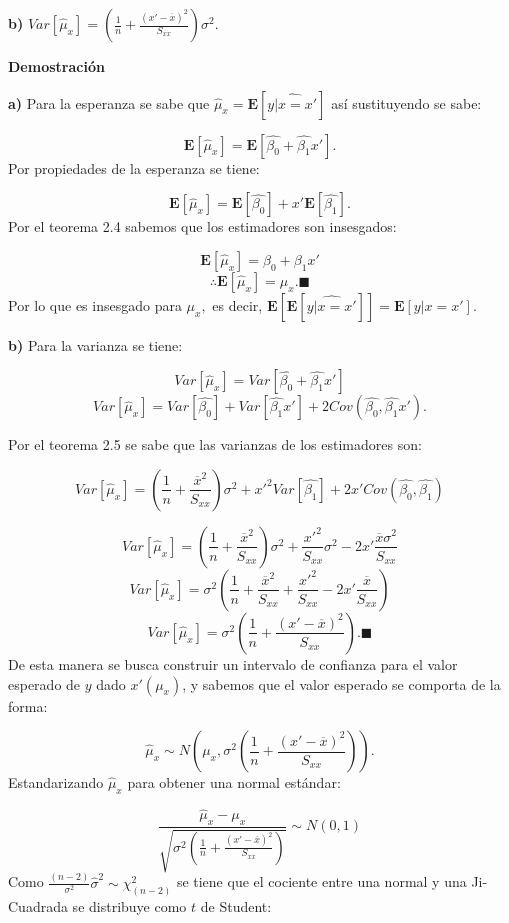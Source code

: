 \documentclass[a4paper,oneside,openany]{book}
\begin{document}
\textbf{b)}
\(Var[\hat{\mu}_{x}]=\left(\frac{1}{n}+\frac{(x'-\overline{x})^2}{S_{xx}}\right)\sigma^2.\)

\textbf{Demostración}

\textbf{a)} Para la esperanza se sabe que
\(\hat{\mu}_{x}=\mathbf{E}[\widehat{y|x=x'}]\) así sustituyendo se sabe:

\[\mathbf{E}[\hat{\mu}_{x}]=\mathbf{E}\left[\hat{\beta_{0}}+\hat{\beta_{1}}x' \right].\]
Por propiedades de la esperanza se tiene:

\[\mathbf{E}[\hat{\mu}_{x}]=\mathbf{E}\left[\hat{\beta_{0}}\right]+x'\mathbf{E}\left[\hat{\beta_{1}} \right].\]
Por el teorema 2.4 sabemos que los estimadores son insesgados:

\[\mathbf{E}[\hat{\mu}_{x}]=\beta_{0}+\beta_{1}x'\]
\[\therefore \mathbf{E}[\hat{\mu}_{x}]=\mu_{x}. \blacksquare\] Por lo
que es insesgado para \(\mu_{x},\) es decir,
\(\mathbf{E}\left[\mathbf{E}[\widehat{y|x=x'}] \right]=\mathbf{E}[y|x=x'].\)

\textbf{b)} Para la varianza se tiene:

\[Var[\hat{\mu}_{x}]=Var\left[\hat{\beta_{0}}+\hat{\beta_{1}}x'\right]\]
\[Var[\hat{\mu}_{x}]=Var[\hat{\beta_{0}}]+Var[\hat{\beta_{1}}x']+2Cov(\hat{\beta_{0}},\hat{\beta_{1}}x').\]

Por el teorema 2.5 se sabe que las varianzas de los estimadores son:

\[Var[\hat{\mu}_{x}]=\left( \frac{1}{n}+\frac{\overline{x}^2}{S_{xx}}\right)\sigma^2+x'^2Var[\hat{\beta_{1}}]+2x'Cov(\hat{\beta_{0}},\hat{\beta_{1}})\]

\[Var[\hat{\mu}_{x}]=\left( \frac{1}{n}+\frac{\overline{x}^2}{S_{xx}}\right)\sigma^2+\frac{x'^2}{S_{xx}}\sigma^2-2x'\frac{\overline{x}\sigma^2}{S_{xx}}\]
\[Var[\hat{\mu}_{x}]=\sigma^2\left( \frac{1}{n}+\frac{\overline{x}^2}{S_{xx}}+\frac{x'^2}{S_{xx}}-2x'\frac{\overline{x}}{S_{xx}}\right)\]
\[Var[\hat{\mu}_{x}]=\sigma^2\left( \frac{1}{n}+\frac{(x'-\overline{x})^2}{S_{xx}}\right). \blacksquare\]
De esta manera se busca construir un intervalo de confianza para el
valor esperado de \(y\) dado \(x'(\mu_{x})\), y sabemos que el valor
esperado se comporta de la forma:

\[\hat{\mu}_{x}\sim N\left(\mu_{x},\sigma^2\left( \frac{1}{n}+\frac{(x'-\overline{x})^2}{S_{xx}}\right)\right).\]
Estandarizando \(\hat{\mu}_{x}\) para obtener una normal estándar:

\[\frac{\hat{\mu}_{x}-\mu_{x}}{\sqrt{\sigma^2\left( \frac{1}{n}+\frac{(x'-\overline{x})^2}{S_{xx}}\right)}}\sim N(0,1)\]
Como \(\frac{(n-2)}{\sigma^2}\hat{\sigma}^2\sim\chi^2_{(n-2)}\) se tiene
que el cociente entre una normal y una Ji-Cuadrada se distribuye como
\(t\) de Student:
\end{document}
